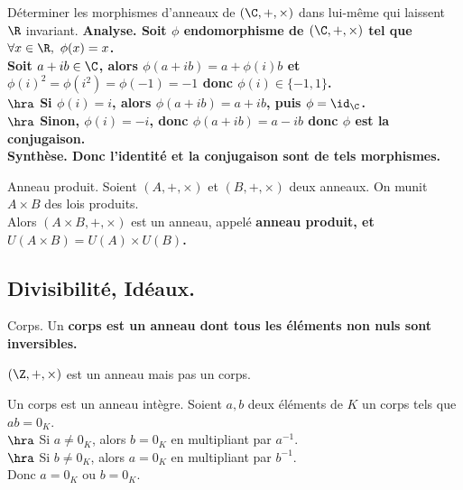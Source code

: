 \documentclass[11pt]{article}
\begin{document}
\vspace*{-0.8cm}

\begin{ex}{}{}
    Déterminer les morphismes d'anneaux de $(\C,+,\times)$ dans lui-même qui laissent $\R$ invariant.
    \tcblower
    \bf{Analyse.} Soit $\phi$ endomorphisme de $(\C,+,\times)$ tel que $\forall x \in \R, ~ \phi(x)=x$.\\
    Soit $a+ib\in\C$, alors $\phi(a+ib)=a+\phi(i)b$ et $\phi(i)^2=\phi(i^2)=\phi(-1)=-1$ donc $\phi(i)\in\{-1,1\}$.\\
    $\hra$ Si $\phi(i)=i$, alors $\phi(a+ib)=a+ib$, puis $\phi=\id_\C$.\\
    $\hra$ Sinon, $\phi(i)=-i$, donc $\phi(a+ib)=a-ib$ donc $\phi$ est la conjugaison.\\
    \bf{Synthèse.} Donc l'identité et la conjugaison sont de tels morphismes.
\end{ex}

\vspace*{-0.8cm}

\begin{defi}{Anneau produit.}{}
    Soient $(A,+,\times)$ et $(B,+,\times)$ deux anneaux. On munit $A\times B$ des lois produits.\\
    Alors $(A\times B, +, \times)$ est un anneau, appelé \bf{anneau produit}, et $U(A\times B)=U(A)\times U(B)$.
\end{defi}

\vspace*{-1cm}

\subsection{Divisibilité, Idéaux.}

\begin{defi}{Corps.}{}
    Un \bf{corps} est un anneau dont tous les éléments non nuls sont inversibles.
\end{defi}

\vspace*{-0.8cm}

\begin{ex}{}{}
    $(\Z,+,\times)$ est un anneau mais pas un corps.
\end{ex}

\vspace*{-0.8cm}

\begin{prop}{}{}
    Un corps est un anneau intègre.
    \tcblower
    Soient $a,b$ deux éléments de $K$ un corps tels que $ab=0_K$.\\
    $\hra$ Si $a\neq0_K$, alors $b=0_K$ en multipliant par $a^{-1}$.\\
    $\hra$ Si $b\neq0_K$, alors $a=0_K$ en multipliant par $b^{-1}$.\\
    Donc $a=0_K$ ou $b=0_K$.
\end{prop}
\end{document}
